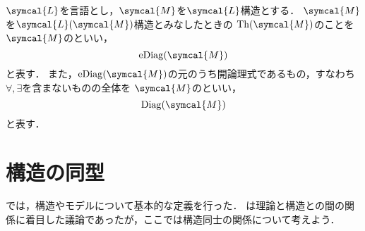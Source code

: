 \begin{Def} \label{Def:modeldiagram}
	\(\symcal{L}\)を言語とし，\(\symcal{M}\)を\(\symcal{L}\)構造とする．
	\(\symcal{M}\)を\(\languagewithname{\symcal{L}}{\symcal{M}}\)構造とみなしたときの
	\(\apply{\Th}{\symcal{M}}\)のことを
	\(\symcal{M}\)のといい，
	\begin{equation}
		\apply{\eDiag}{\symcal{M}}
		\label{eq:modelelementalydiagram}
	\end{equation}
	と表す．
	また，\(\apply{\eDiag}{\symcal{M}}\)の元のうち開論理式であるもの，すなわち\(\forall, \exists\)を含まないものの全体を
	\(\symcal{M}\)のといい，
	\begin{equation}
		\apply{\Diag}{\symcal{M}}
		\label{eq:modeldiagram}
	\end{equation}
	と表す．
\end{Def}



\section{構造の同型} \label{sec:isomorphic}

では，構造やモデルについて基本的な定義を行った．
は理論と構造との間の関係に着目した議論であったが，ここでは構造同士の関係について考えよう．

